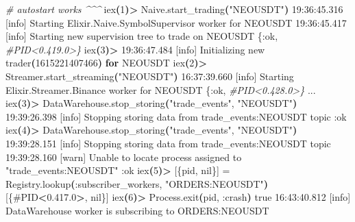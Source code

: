 \documentclass[
  oneside]{book}
\newenvironment{Shaded}{\begin{snugshade}}{\end{snugshade}}
\newcommand{\CommentTok}[1]{\textcolor[rgb]{0.56,0.35,0.01}{\textit{#1}}}
\newcommand{\ControlFlowTok}[1]{\textcolor[rgb]{0.13,0.29,0.53}{\textbf{#1}}}
\newcommand{\ErrorTok}[1]{\textcolor[rgb]{0.64,0.00,0.00}{\textbf{#1}}}
\newcommand{\ExtensionTok}[1]{#1}
\newcommand{\FunctionTok}[1]{\textcolor[rgb]{0.00,0.00,0.00}{#1}}
\newcommand{\KeywordTok}[1]{\textcolor[rgb]{0.13,0.29,0.53}{\textbf{#1}}}
\newcommand{\NormalTok}[1]{#1}
\newcommand{\OperatorTok}[1]{\textcolor[rgb]{0.81,0.36,0.00}{\textbf{#1}}}
\newcommand{\StringTok}[1]{\textcolor[rgb]{0.31,0.60,0.02}{#1}}
\begin{document}
\begin{Shaded}
\begin{Highlighting}[]
\CommentTok{\# autostart works \^{}\^{}\^{}}
\ExtensionTok{iex}\ErrorTok{(}\ExtensionTok{1}\KeywordTok{)}\OperatorTok{\textgreater{}}\NormalTok{ Naive.start\_trading}\KeywordTok{(}\StringTok{"NEOUSDT"}\KeywordTok{)}
\ExtensionTok{19:36:45.316}\NormalTok{ [info]  Starting Elixir.Naive.SymbolSupervisor worker for NEOUSDT}
\ExtensionTok{19:36:45.417}\NormalTok{ [info]  Starting new supervision tree to trade on NEOUSDT}
\ExtensionTok{\{:ok,} \CommentTok{\#PID\textless{}0.419.0\textgreater{}\}}
\ExtensionTok{iex}\ErrorTok{(}\ExtensionTok{3}\KeywordTok{)}\OperatorTok{\textgreater{}} 
\ExtensionTok{19:36:47.484}\NormalTok{ [info]  Initializing new trader}\ErrorTok{(}\ExtensionTok{1615221407466}\KeywordTok{)} \ControlFlowTok{for}\NormalTok{ NEOUSDT}
\ExtensionTok{iex}\ErrorTok{(}\ExtensionTok{2}\KeywordTok{)}\OperatorTok{\textgreater{}}\NormalTok{ Streamer.start\_streaming}\KeywordTok{(}\StringTok{"NEOUSDT"}\KeywordTok{)}
\ExtensionTok{16:37:39.660}\NormalTok{ [info]  Starting Elixir.Streamer.Binance worker for NEOUSDT}
\ExtensionTok{\{:ok,} \CommentTok{\#PID\textless{}0.428.0\textgreater{}\}}
\ExtensionTok{...}
\ExtensionTok{iex}\ErrorTok{(}\ExtensionTok{3}\KeywordTok{)}\OperatorTok{\textgreater{}}\NormalTok{ DataWarehouse.stop\_storing}\KeywordTok{(}\StringTok{"trade\_events"}\ExtensionTok{,} \StringTok{"NEOUSDT"}\KeywordTok{)}
\ExtensionTok{19:39:26.398}\NormalTok{ [info]  Stopping storing data from trade\_events:NEOUSDT topic}
\ExtensionTok{:ok}
\ExtensionTok{iex}\ErrorTok{(}\ExtensionTok{4}\KeywordTok{)}\OperatorTok{\textgreater{}}\NormalTok{ DataWarehouse.stop\_storing}\KeywordTok{(}\StringTok{"trade\_events"}\ExtensionTok{,} \StringTok{"NEOUSDT"}\KeywordTok{)}
\ExtensionTok{19:39:28.151}\NormalTok{ [info]  Stopping storing data from trade\_events:NEOUSDT topic}
\ExtensionTok{19:39:28.160}\NormalTok{ [warn]  Unable to locate process assigned to }\StringTok{"trade\_events:NEOUSDT"}
\ExtensionTok{:ok}
\ExtensionTok{iex}\ErrorTok{(}\ExtensionTok{5}\KeywordTok{)}\OperatorTok{\textgreater{}}\NormalTok{ [\{pid, }\ExtensionTok{nil\}]}\NormalTok{ = Registry.lookup}\ErrorTok{(}\ExtensionTok{:subscriber\_workers,} \StringTok{"ORDERS:NEOUSDT"}\KeywordTok{)}
\ExtensionTok{[\{\#PID}\OperatorTok{\textless{}}\NormalTok{0.417.0}\OperatorTok{\textgreater{}}\NormalTok{, nil\}]}
\ExtensionTok{iex}\ErrorTok{(}\ExtensionTok{6}\KeywordTok{)}\OperatorTok{\textgreater{}}\NormalTok{ Process.exit}\KeywordTok{(}\ExtensionTok{pid,}\NormalTok{ :crash}\KeywordTok{)}
\FunctionTok{true}
\ExtensionTok{16:43:40.812}\NormalTok{ [info]  DataWarehouse worker is subscribing to ORDERS:NEOUSDT}
\end{Highlighting}
\end{Shaded}
\end{document}
